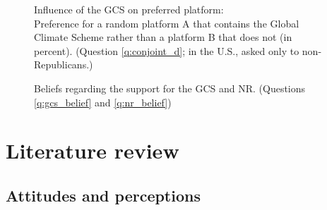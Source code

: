 \documentclass[12pt,english]{article}
\begin{document}
\begin{figure}[h!]
  \caption[Influence of the GCS on preferred platform]{Influence of the GCS on preferred platform:\\ Preference for a random platform A that contains the Global Climate Scheme rather than a platform B that does not (in percent). (Question \ref{q:conjoint_d}; in the U.S., asked only to non-Republicans.)}\label{fig:conjoint_left_ag_b}
\end{figure}


\begin{figure}[h!]
  \caption[Beliefs about support for the GCS and NR]{Beliefs regarding the support for the GCS and NR. (Questions \ref{q:gcs_belief} and \ref{q:nr_belief})}\label{fig:belief}
\end{figure}

\appendix %
\renewcommand{\thetable}{A\arabic{table}}
\renewcommand{\thefigure}{A\arabic{figure}}
\setcounter{figure}{0}
\setcounter{table}{0}

\clearpage
\section{Literature review}\label{sec:literature}

\subsection{Attitudes and perceptions}\label{subsec:literature_attitudes}
\end{document}
